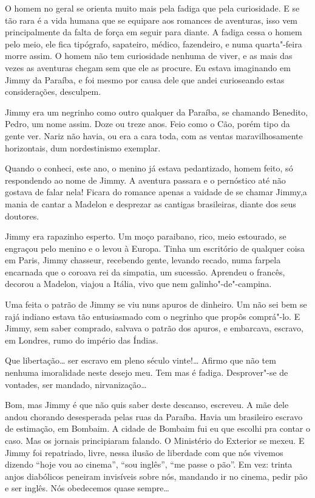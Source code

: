 O homem no geral se orienta muito mais pela fadiga que pela curiosidade.
E se tão rara é a vida humana que se equipare aos romances de aventuras,
isso vem principalmente da falta de força em seguir para diante. A
fadiga cessa o homem pelo meio, ele fica tipógrafo, sapateiro, médico,
fazendeiro, e numa quarta"-feira morre assim. O homem não tem curiosidade
nenhuma de viver, e as mais das vezes as aventuras chegam sem que ele as
procure. Eu estava imaginando em Jimmy da Paraíba, e foi mesmo por causa
dele que andei curioseando estas considerações, desculpem.

Jimmy era um negrinho como outro qualquer da Paraíba, se chamando
Benedito, Pedro, um nome assim. Doze ou treze anos. Feio como o Cão,
porém tipo da gente ver. Nariz não havia, ou era a cara toda, com as
ventas maravilhosamente horizontais, dum nordestinismo exemplar.

Quando o conheci, este ano, o menino já estava pedantizado, homem feito,
só respondendo ao nome de Jimmy. A aventura passara e o pernóstico até
não gostava de falar nela! Ficara do romance apenas a vaidade de se
chamar Jimmy,a mania de cantar a Madelon e desprezar as cantigas
brasileiras, diante dos seus doutores.

Jimmy era rapazinho esperto. Um moço paraibano, rico, meio estourado, se
engraçou pelo menino e o levou à Europa. Tinha um escritório de qualquer
coisa em Paris, Jimmy chasseur, recebendo gente, levando recado, numa
farpela encarnada que o coroava rei da simpatia, um sucessão. Aprendeu o
francês, decorou a Madelon, viajou a Itália, vivo que nem
galinho"-de"-campina.

Uma feita o patrão de Jimmy se viu nuns apuros de dinheiro. Um não sei
bem se rajá indiano estava tão entusiasmado com o negrinho que propôs
comprá"-lo. E Jimmy, sem saber comprado, salvava o patrão dos apuros, e
embarcava, escravo, em Londres, rumo do império das Índias.

Que libertação\ldots{} ser escravo em pleno século vinte!\ldots{} Afirmo que não
tem nenhuma imoralidade neste desejo meu. Tem mas é fadiga. Desprover"-se
de vontades, ser mandado, nirvanização\ldots{}

Bom, mas Jimmy é que não quis saber deste descanso, escreveu. A mãe dele
andou chorando desesperada pelas ruas da Paraíba. Havia um brasileiro
escravo de estimação, em Bombaim. A cidade de Bombaim fui eu que escolhi
pra contar o caso. Mas os jornais principiaram falando. O Ministério do
Exterior se mexeu. E Jimmy foi repatriado, livre, nessa ilusão de
liberdade com que nós vivemos dizendo ``hoje vou ao cinema'', ``sou
inglês'', ``me passe o pão''. Em vez: trinta anjos diabólicos peneiram
invisíveis sobre nós, mandando ir no cinema, pedir pão e ser inglês. Nós
obedecemos quase sempre\ldots{}


